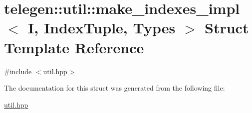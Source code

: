 \hypertarget{structtelegen_1_1util_1_1make__indexes__impl}{}\section{telegen\+:\+:util\+:\+:make\+\_\+indexes\+\_\+impl$<$ I, Index\+Tuple, Types $>$ Struct Template Reference}
\label{structtelegen_1_1util_1_1make__indexes__impl}


{\ttfamily \#include $<$util.\+hpp$>$}



The documentation for this struct was generated from the following file\+:\begin{DoxyCompactItemize}
\item 
\hyperlink{util_8hpp}{util.\+hpp}\end{DoxyCompactItemize}
